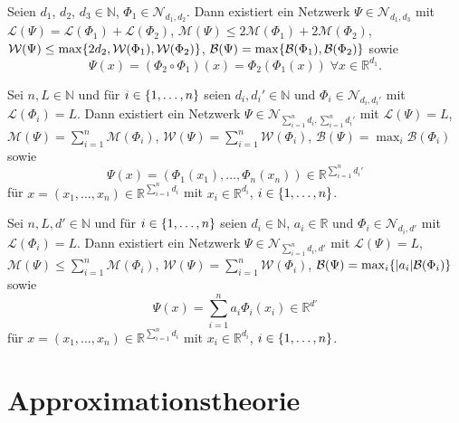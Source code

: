 \documentclass[11pt]{scrartcl}
\newcommand{\N}{\mathbb{N}} %
\newcommand{\R}{\mathbb{R}} %
\begin{document}
\begin{lemma}
	Seien \(d_1\), \(d_2\), \(d_3 \in \N\), \(\Phi_1 \in \mathcal{N}_{d_1, d_2}\). Dann existiert ein 
	Netzwerk \(\Psi \in \mathcal{N}_{d_1, d_3}\) mit \(\mathcal{L}(\Psi) = \mathcal{L}(\Phi_1) + \mathcal{L}(\Phi_2)\), 
	\(\mathcal{M}(\Psi) \leq 2 \mathcal{M}(\Phi_1) + 2\mathcal{M}(\Phi_2)\), \(\mathcal{W}(\Psi) \leq 
	\max\{2d_2, \mathcal{W}(\Phi_1), \mathcal{W}(\Phi_2)\}\), \(\mathcal{B}(\Psi) = \max\{\mathcal{B}(\Phi_1), \mathcal{B}(\Phi_2)\}\) 
	sowie
	\[ \Psi(x) = (\Phi_2 \circ \Phi_1)(x) = \Phi_2(\Phi_1(x)) \;\forall x\in \R^{d_1}. \]
\end{lemma}

\begin{lemma}
	Sei \(n, L \in\N\) und für \(i\in \{1,\ldots, n\}\) seien \(d_i, d_i' \in \N\) und \(\Phi_i \in \mathcal{N}_{d_i, d_i'}\) 
	mit \(\mathcal{L}(\Phi_i) = L\). Dann existiert ein Netzwerk \(\Psi \in \mathcal{N}_{\sum_{i=1}^n d_i, \sum_{i=1}^n d_i'}\) 
	mit \(\mathcal{L}(\Psi) = L\), \(\mathcal{M}(\Psi) = \sum_{i=1}^n \mathcal{M}(\Phi_i)\), 
	\(\mathcal{W}(\Psi) = \sum_{i=1}^n \mathcal{W}(\Phi_i)\), \(\mathcal{B}(\Psi) = \max_i \mathcal{B}(\Phi_i)\) sowie 
	\[ \Psi(x) = (\Phi_1(x_1), \ldots, \Phi_n(x_n)) \in \R^{\sum_{i=1}^n d_i'} \]
	für \(x = (x_1, \ldots, x_n) \in \R^{\sum_{i=1}^n d_i}\) mit \(x_i \in \R^{d_i}\), \(i\in \{1,\ldots, n\}\).
\end{lemma}

\begin{lemma}
	Sei \(n, L, d' \in\N\) und für \(i\in \{1,\ldots, n\}\) seien \(d_i \in \N\), \(a_i \in \R\) und \(\Phi_i \in \mathcal{N}_{d_i, d'}\) 
	mit \(\mathcal{L}(\Phi_i) = L\). Dann existiert ein Netzwerk \(\Psi \in \mathcal{N}_{\sum_{i=1}^n d_i, d'}\) 
	mit \(\mathcal{L}(\Psi) = L\), \(\mathcal{M}(\Psi) \leq \sum_{i=1}^n \mathcal{M}(\Phi_i)\), 
	\(\mathcal{W}(\Psi) = \sum_{i=1}^n \mathcal{W}(\Phi_i)\), \(\mathcal{B}(\Psi) = \max_i \{|a_i| \mathcal{B}(\Phi_i)\}\) sowie 
	\[ \Psi(x) = \sum_{i=1}^n a_i \Phi_i(x_i) \in \R^{d'} \]
	für \(x = (x_1, \ldots, x_n) \in \R^{\sum_{i=1}^n d_i}\) mit \(x_i \in \R^{d_i}\), \(i\in \{1,\ldots, n\}\).
\end{lemma}

\section{Approximationstheorie}
\end{document}
